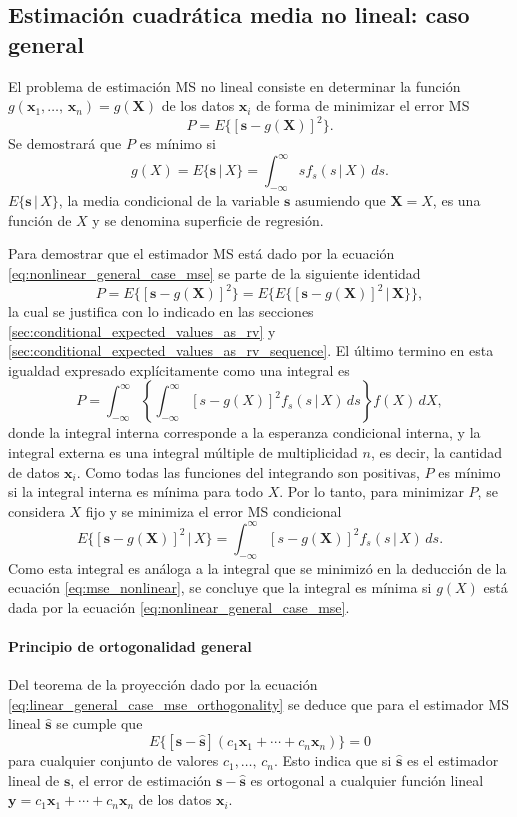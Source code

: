 \documentclass[a4paper]{report}
\newcommand{\X}{\mathbf{X}}
\newcommand{\x}{\mathbf{x}}
\newcommand{\y}{\mathbf{y}}
\newcommand{\s}{\mathbf{s}}
\begin{document}
\subsection{Estimación cuadrática media no lineal: caso general}

El problema de estimación MS no lineal consiste en determinar la función \(g(\x_1,\dots,\,\x_n)=g(\X)\) de los datos \(\x_i\) de forma de minimizar el error MS
\[
 P=E\{[\s-g(\X)]^2\}.
\]
Se demostrará que \(P\) es mínimo si
\begin{equation}\label{eq:nonlinear_general_case_mse}
 g(X)=E\{\s\,|\,X\}=\int_{-\infty}^{\infty}sf_s(s\,|\,X)\,ds.
\end{equation}
\(E\{\s\,|\,X\}\), la media condicional de la variable \(\s\) asumiendo que \(\X=X\), es una función de \(X\) y se denomina superficie de regresión. 

Para demostrar que el estimador MS está dado por la ecuación \ref{eq:nonlinear_general_case_mse} se parte de la siguiente identidad
\[
 P=E\{[\s-g(\X)]^2\}=E\{E\{[\s-g(\X)]^2\,|\,\X\}\},
\]
la cual se justifica con lo indicado en las secciones \ref{sec:conditional_expected_values_as_rv} y \ref{sec:conditional_expected_values_as_rv_sequence}. El último termino en esta igualdad expresado explícitamente como una integral es
\[
 P=\int_{-\infty}^{\infty}\left\{\int_{-\infty}^{\infty}[s-g(X)]^2f_s(s\,|\,X)\,ds\right\}f(X)\,dX,
\]
donde la integral interna corresponde a la esperanza condicional interna, y la integral externa es una integral múltiple de multiplicidad \(n\), es decir, la cantidad de datos \(\x_i\). Como todas las funciones del integrando son positivas, \(P\) es mínimo si la integral interna es mínima para todo \(X\). Por lo tanto, para minimizar \(P\), se considera \(X\) fijo y se minimiza el error MS condicional
\[
 E\{[\s-g(\X)]^2\,|\,X\}=\int_{-\infty}^{\infty}[s-g(\X)]^2f_s(s\,|\,X)\,ds.
\]
Como esta integral es análoga a la integral que se minimizó en la deducción de la ecuación \ref{eq:mse_nonlinear}, se concluye que la integral es mínima si \(g(X)\) está dada por la ecuación \ref{eq:nonlinear_general_case_mse}.

\paragraph{Principio de ortogonalidad general}

Del teorema de la proyección dado por la ecuación \ref{eq:linear_general_case_mse_orthogonality} se deduce que para el estimador MS lineal \(\hat{\s}\) se cumple que
\[
 E\{[\s-\hat{\s}](c_1\x_1+\cdots+c_n\x_n)\}=0
\]
para cualquier conjunto de valores \(c_1,\dots,\,c_n\). Esto indica que si \(\hat{\s}\) es el estimador lineal de \(\s\), el error de estimación \(\s-\hat{\s}\) es ortogonal a cualquier función lineal \(\y=c_1\x_1+\cdots+c_n\x_n\) de los datos \(\x_i\).
\end{document}
